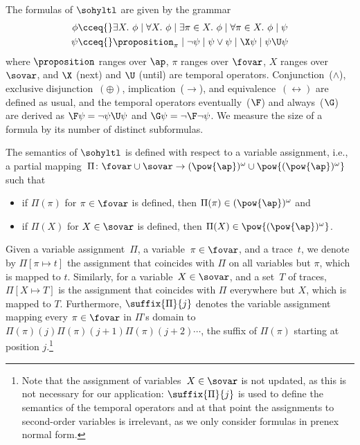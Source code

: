 The formulas of $\sohyltl$ are given by the grammar
\begin{align*}
\phi  {} \cceq {}&{} \exists X.\ \phi \mid \forall X.\ \phi \mid \exists \pi \in X.\ \phi \mid \forall \pi \in X.\ \phi \mid \psi \\
\psi {}  \cceq {}&{} \proposition_\pi \mid \neg \psi \mid \psi \vee \psi \mid \X \psi \mid \psi \U \psi    
\end{align*}
where $\proposition$ ranges over $\ap$, $\pi$ ranges over $\fovar$, $X$ ranges over $\sovar$, and $\X$ (next) and $\U$ (until) are temporal operators. Conjunction~($\wedge$), exclusive disjunction~$(\oplus)$, implication~($\rightarrow$), and equivalence~$(\leftrightarrow)$ are defined as usual, and the temporal operators eventually~($\F$) and always~($\G$) are derived as $\F\psi = \neg \psi\U \psi$ and $\G \psi = \neg \F \neg \psi$. We measure the size of a formula by its number of distinct subformulas.

The semantics of $\sohyltl$ is defined with respect to a variable assignment, i.e., a partial mapping~$\Pi \colon \fovar \cup \sovar \rightarrow (\pow{\ap})^\omega \cup \pow{(\pow{\ap})^\omega}$
such that
\begin{itemize}
    \item if $\Pi(\pi)$ for $\pi\in\fovar$ is defined, then $\Pi(\pi) \in (\pow{\ap})^\omega$ and
    \item if $\Pi(X)$ for $X \in\sovar$ is defined, then $\Pi(X) \in \pow{(\pow{\ap})^\omega}$.
\end{itemize}
Given a variable assignment~$\Pi$, a variable~$\pi \in \fovar$, and a trace~$t$, we denote by $\Pi[\pi \mapsto t]$ the assignment that coincides with $\Pi$ on all variables but $\pi$, which is mapped to $t$. 
Similarly, for a variable~$X \in \sovar$, and a set~$T$ of traces, $\Pi[X \mapsto T]$ is the assignment that coincides with $\Pi$ everywhere but $X$, which is mapped to $T$.
Furthermore, $\suffix{\Pi}{j}$ denotes the variable assignment mapping every $\pi \in \fovar$ in $\Pi$'s domain to $\Pi(\pi)(j)\Pi(\pi)(j+1)\Pi(\pi)(j+2) \cdots $, the suffix of $\Pi(\pi)$ starting at position $j$.\footnote{Note that the assignment of variables~$X \in \sovar$ is not updated, as this is not necessary for our application: $\suffix{\Pi}{j}$ is used to define the semantics of the temporal operators and at that point the assignments to second-order variables is irrelevant, as we only consider formulas in prenex normal form.}

